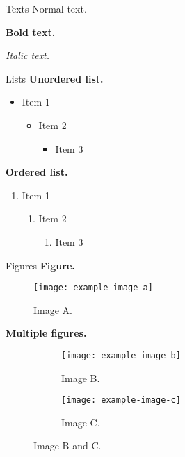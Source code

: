 \documentclass[10pt,aspectratio=169]{beamer}
\begin{document}
{
\begin{frame}[plain,t]
\titlepage
\end{frame}
}

\begin{frame}[t]{Texts}
Normal text.

\textbf{Bold text.} 

\textit{Italic text.} 
\end{frame}

\begin{frame}[t]{Lists}
\textbf{Unordered list.}
\begin{itemize}
    \item Item 1
        \begin{itemize}
            \item Item 2
                \begin{itemize}
                    \item Item 3
                \end{itemize}
        \end{itemize}
\end{itemize}
\textbf{Ordered list.}
\begin{enumerate}
    \item Item 1
        \begin{enumerate}
            \item Item 2
                \begin{enumerate}
                    \item Item 3
                \end{enumerate}
        \end{enumerate}
\end{enumerate}
\end{frame}

\begin{frame}[t]{Figures}
\textbf{Figure.}
\begin{figure}
    \centering
    \texttt{[image: example-image-a]}
    \caption{Image A.}
    \label{fig:eg-a}
\end{figure}
\textbf{Multiple figures.}
\begin{figure}
    \centering
    \begin{subfigure}[b]{2cm}
    \centering
    \texttt{[image: example-image-b]}
    \caption{Image B.}
    \end{subfigure}
    \hspace{.2in}
    \begin{subfigure}[b]{2cm}
    \centering
    \texttt{[image: example-image-c]}
    \caption{Image C.}
    \end{subfigure}
    \caption{Image B and C.}
\end{figure}
\end{frame}
\end{document}
